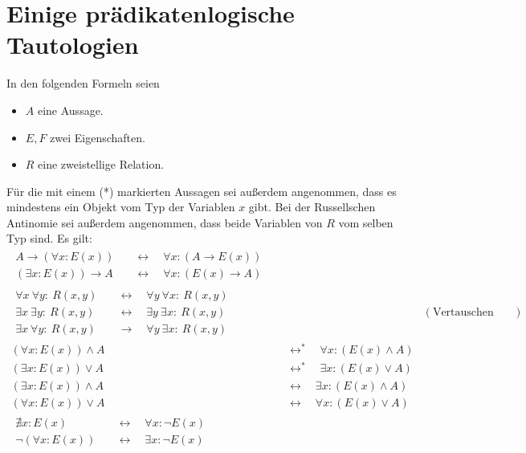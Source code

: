 \section{Einige prädikatenlogische Tautologien}
In den folgenden Formeln seien
\begin{itemize}
    \item $A$ eine Aussage.
    \item $E,F$ zwei Eigenschaften.
    \item $R$ eine zweistellige Relation.
\end{itemize}
Für die mit einem (*) markierten Aussagen sei außerdem angenommen, dass es mindestens ein Objekt vom Typ der Variablen $x$ gibt. Bei der Russellschen Antinomie sei außerdem angenommen, dass beide Variablen von $R$ vom selben Typ sind. Es gilt:
\begingroup
\allowdisplaybreaks
\begin{align*}
    \begin{split}
        A \to (\forall x : E(x)) & \quad\leftrightarrow\quad \forall x : (A \to E(x)) \\
        (\exists x : E(x)) \to A & \quad\leftrightarrow\quad \forall x : (E(x) \to A)
    \end{split} \\[1em]
    \begin{split}
        \forall x\ \forall y:\ R(x,y) & \quad\leftrightarrow\quad \forall y\ \forall x:\ R(x,y) \\
        \exists x\ \exists y:\ R(x,y) & \quad\leftrightarrow\quad \exists y\ \exists x:\ R(x,y) \\
        \exists x\ \forall y:\ R(x,y) & \quad\to\quad \forall y\ \exists x:\ R(x,y)
    \end{split} && (\text{Vertauschen von Quantoren}) \\[1em]
    (\forall x : E(x)) \land A &  \quad\leftrightarrow^*\quad  \forall x :(E(x) \land A) \\
    (\exists x : E(x)) \lor A &  \quad\leftrightarrow^*\quad  \exists x : (E(x) \lor A) \\
    (\exists x : E(x)) \land A &  \quad\leftrightarrow\quad  \exists x : (E(x) \land A) \\
    (\forall x : E(x)) \lor A &  \quad\leftrightarrow\quad  \forall x :(E(x) \lor A) \\[1em] %
    \begin{split}
        \nexists x: E(x) & \quad\leftrightarrow\quad \forall x: \neg E(x) \\
        \neg (\forall x: E(x)) & \quad\leftrightarrow\quad \exists x: \neg E(x) %

\end{split}
\end{align*}
